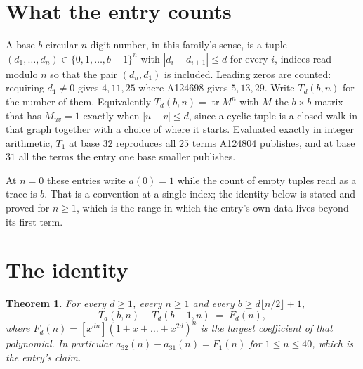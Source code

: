 \documentclass[11pt,a4paper]{article}
\theoremstyle{plain}
\newtheorem{theorem}{Theorem}
\theoremstyle{definition}
\begin{document}
\section{What the entry counts}

A base-$b$ circular $n$-digit number, in this family's sense, is a tuple
$(d_1,\dots,d_n)\in\{0,1,\dots,b-1\}^{n}$ with $|d_i-d_{i+1}|\le d$ for every $i$, indices
read modulo $n$ so that the pair $(d_n,d_1)$ is included. Leading zeros are counted: requiring
$d_1\ne0$ gives $4,11,25$ where A124698 gives $5,13,29$. Write $T_d(b,n)$ for the number of
them. Equivalently $T_d(b,n)=\operatorname{tr}M^{n}$ with $M$ the $b\times b$ matrix that has
$M_{uv}=1$ exactly when $|u-v|\le d$, since a cyclic tuple is a closed walk in that graph
together with a choice of where it starts. Evaluated exactly in integer arithmetic, $T_{1}$
at base $32$ reproduces all $25$ terms A124804 publishes, and at base $31$ all the
terms the entry one base smaller publishes.

At $n=0$ these entries write $a(0)=1$ while the count of empty tuples read as a trace is $b$.
That is a convention at a single index; the identity below is stated and proved for $n\ge1$,
which is the range in which the entry's own data lives beyond its first term.

\section{The identity}

\begin{theorem}
For every $d\ge1$, every $n\ge1$ and every $b\ge d\lfloor n/2\rfloor+1$,
\[
T_d(b,n)-T_d(b-1,n)\;=\;F_d(n),
\]
where $F_d(n)=[x^{dn}](1+x+\dots+x^{2d})^{n}$ is the largest coefficient of that
polynomial. In particular $a_{32}(n)-a_{31}(n)=F_{1}(n)$ for $1\le n\le40$, which
is the entry's claim.
\end{theorem}
\end{document}
